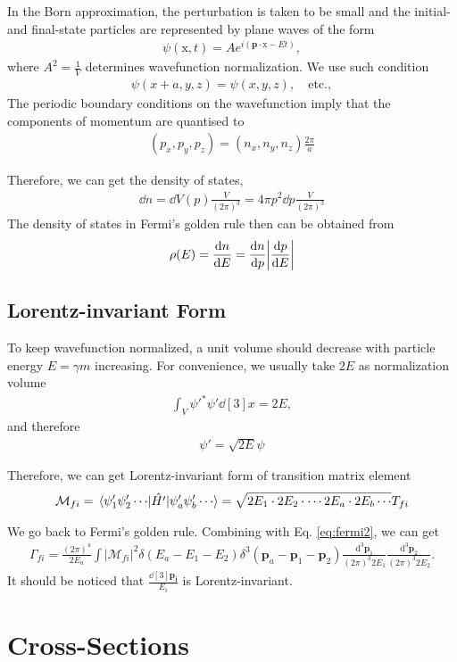 In the Born approximation, the perturbation is taken to be small and the initial- and final-state particles are represented by plane waves of the form
\begin{align}
    \psi(\mathrm{x},t)=Ae^{i(\mathbf{p}\cdot \mathrm{x}-Et)},
\end{align}
where $A^{2}=\frac{1}{V}$ determines wavefunction normalization. We use such condition
\begin{align}
    \psi(x+a,y,z)=\psi(x,y,z),\quad \text{etc.},
\end{align}
The periodic boundary conditions on the wavefunction imply that the components of momentum are quantised to
\begin{align}
    (p_{x},p_{y},p_{z})=(n_{x},n_{y},n_{z})\frac{2\pi}{a}
\end{align}

Therefore, we can get the density of states,
\begin{align}
    \dd{n}=\dd{V(p)}\frac{V}{(2\pi)^{3}}=4\pi p^{2}\dd{p}\frac{V}{(2\pi)^{3}}
\end{align}
The density of states in Fermi’s golden rule then can be obtained from
\begin{align}
    \rho(E)=\frac{\dd{n}}{\dd{E}}=\frac{\dd{n}}{\dd{p}}\abs{\frac{\dd{p}}{\dd{E}}}
\end{align}

\subsection{Lorentz-invariant Form}

To keep wavefunction normalized, a unit volume should decrease with particle energy $E=\gamma m$ increasing. For convenience, we usually take $2E$ as normalization volume
\begin{align}
    \int_{V}\psi'^{*}\psi'\dd[3]{x}=2E,
\end{align}
and therefore
\begin{align}
    \psi'=\sqrt{2E}\psi
\end{align}

Therefore, we can get Lorentz-invariant form of transition matrix element
\begin{align}
    \mathcal{M}_{fi}=\matrixel{\psi'_{1}\psi'_{2}\cdots }{\hat{H'}}{\psi'_{a}\psi'_{b}\cdots }=\sqrt{2E_{1}\cdot 2E_{2}\cdot \cdots 2E_{a}\cdot 2E_{b}\cdots }T_{fi}
\end{align}

We go back to Fermi's golden rule. Combining with Eq. \ref{eq:fermi2}, we can get 
\begin{align}
    \Gamma_{f i}=\frac{(2 \pi)^4}{2 E_a} \int\left|\mathcal{M}_{f i}\right|^2 \delta\left(E_a-E_1-E_2\right) \delta^3\left(\mathbf{p}_a-\mathbf{p}_1-\mathbf{p}_2\right) \frac{\mathrm{d}^3 \mathbf{p}_1}{(2 \pi)^3 2 E_1} \frac{\mathrm{d}^3 \mathbf{p}_2}{(2 \pi)^3 2 E_2}.
\end{align}
It should be noticed that $\frac{\dd[3]{\mathbf{p_{i}}}}{E_{i}}$ is Lorentz-invariant.





\section{Cross-Sections}